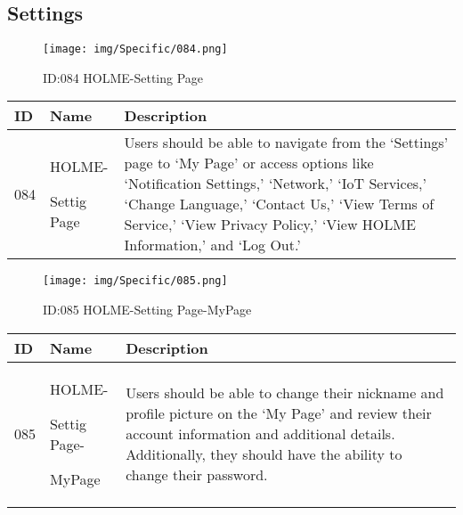 \documentclass[conference]{IEEEtran}
\begin{document}
\begin{enumerate}
\subsection{Settings}
\begin{figure}[h]
\centering                                         
\texttt{[image: img/Specific/084.png]}
\caption{ID:084 HOLME-Setting Page}
\end{figure}
\begin{table}[h]
\def\arraystretch{1.2} \small
    \begin{tabular}{|p{1cm}|p{1.8cm}|p{5.0cm}|}
        \hline
        ID & Name & Description\\ \hline
         084 \par  & HOLME-\par Settig Page & 
         Users should be able to navigate from the `Settings' page to `My Page' or access options like `Notification Settings,' `Network,' `IoT Services,' `Change Language,' `Contact Us,' `View Terms of Service,' `View Privacy Policy,' `View HOLME Information,' and `Log Out.'
         \\ \hline
    \end{tabular}
\end{table}
\begin{figure}[h]
\centering                                         
\texttt{[image: img/Specific/085.png]}
\caption{ID:085 HOLME-Setting Page-MyPage}
\end{figure}
\begin{table}[h]
\def\arraystretch{1.2} \small
    \begin{tabular}{|p{1cm}|p{1.8cm}|p{5.0cm}|}
        \hline
        ID & Name & Description\\ \hline
         085 \par  & HOLME-\par Settig Page- \par MyPage & 
        Users should be able to change their nickname and profile picture on the `My Page' and review their account information and additional details. Additionally, they should have the ability to change their password.
         \\ \hline
    \end{tabular}
\end{table}
\clearpage


\end{enumerate}
\end{document}
